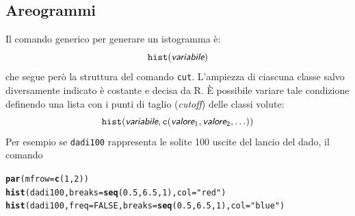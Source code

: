 \documentclass[onecolumn,12pt]{book}\usepackage[]{graphicx}\usepackage[]{color}
\makeatletter
\newcommand{\hlnum}[1]{\textcolor[rgb]{0.686,0.059,0.569}{#1}}%
\newcommand{\hlstr}[1]{\textcolor[rgb]{0.192,0.494,0.8}{#1}}%
\newcommand{\hlstd}[1]{\textcolor[rgb]{0.345,0.345,0.345}{#1}}%
\newcommand{\hlkwc}[1]{\textcolor[rgb]{0.333,0.667,0.333}{#1}}%
\newcommand{\hlkwd}[1]{\textcolor[rgb]{0.737,0.353,0.396}{\textbf{#1}}}%
\newenvironment{kframe}{%
 \def\at@end@of@kframe{}%
 \ifinner\ifhmode%
  \def\at@end@of@kframe{\end{minipage}}%
  \begin{minipage}{\columnwidth}%
 \fi\fi%
 \def\FrameCommand##1{\hskip\@totalleftmargin \hskip-\fboxsep
 \colorbox{shadecolor}{##1}\hskip-\fboxsep
     \hskip-\linewidth \hskip-\@totalleftmargin \hskip\columnwidth}%
 \MakeFramed {\advance\hsize-\width
   \@totalleftmargin\z@ \linewidth\hsize
   \@setminipage}}%
 {\par\unskip\endMakeFramed%
 \at@end@of@kframe}
\newenvironment{knitrout}{}{} %
\newcommand{\varia}[1]{\textsl{\textsf{#1}}}
\makeatother
\begin{document}
\subsection{Areogrammi}
Il comando generico per generare un istogramma \`e:
\begin{equation*}
\texttt{hist}(\varia{variabile})\index{\texttt{hist}}
\end{equation*}
che segue per\`o la struttura del comando \texttt{cut}. L'ampiezza di ciascuna classe salvo diversamente indicato \`e costante e decisa da \textsf{R}.
\`E  possibile variare tale condizione definendo una lista con i punti di taglio ({\it cutoff}) delle classi volute:
\begin{equation} \texttt{hist}(\varia{variabile},\texttt{c}(\varia{valore}_1, \varia{valore}_2, \ldots))
\end{equation}
Per esempio se \texttt{dadi100} rappresenta le solite 100 uscite del lancio del dado, il comando
\begin{knitrout}
\color{fgcolor}\begin{kframe}
\begin{alltt}
\hlkwd{par}\hlstd{(}\hlkwc{mfrow}\hlstd{=}\hlkwd{c}\hlstd{(}\hlnum{1}\hlstd{,}\hlnum{2}\hlstd{))}
\hlkwd{hist}\hlstd{(dadi100,}\hlkwc{breaks}\hlstd{=}\hlkwd{seq}\hlstd{(}\hlnum{0.5}\hlstd{,}\hlnum{6.5}\hlstd{,}\hlnum{1}\hlstd{),}\hlkwc{col}\hlstd{=}\hlstr{"red"}\hlstd{)}
\hlkwd{hist}\hlstd{(dadi100,}\hlkwc{freq}\hlstd{=}\hlnum{FALSE}\hlstd{,}\hlkwc{breaks}\hlstd{=}\hlkwd{seq}\hlstd{(}\hlnum{0.5}\hlstd{,}\hlnum{6.5}\hlstd{,}\hlnum{1}\hlstd{),}\hlkwc{col}\hlstd{=}\hlstr{"blue"}\hlstd{)}
\end{alltt}
\end{kframe}
\end{knitrout}
\end{document}
